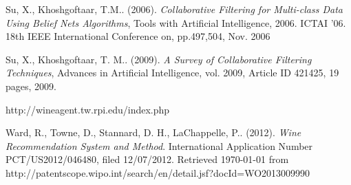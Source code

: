 \begin{thebibliography}{9}
     Su, X., Khoshgoftaar, T.M.. (2006). \emph{Collaborative Filtering for Multi-class Data Using Belief Nets Algorithms}, Tools with Artificial Intelligence, 2006. ICTAI '06. 18th IEEE International Conference on, pp.497,504, Nov. 2006

     Su, X., Khoshgoftaar, T. M.. (2009). \emph{A Survey of Collaborative Filtering Techniques}, Advances in Artificial Intelligence, vol. 2009, Article ID 421425, 19 pages, 2009.

     http://wineagent.tw.rpi.edu/index.php

     Ward, R., Towne, D., Stannard, D. H., LaChappelle, P.. (2012). \emph{Wine Recommendation System and Method}. International Application Number PCT/US2012/046480, filed 12/07/2012. Retrieved \today{} from http://patentscope.wipo.int/search/en/detail.jsf?docId=WO2013009990

\end{thebibliography}
\normalsize

